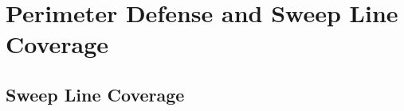 
\chapter{Perimeter Defense and Sweep Line Coverage}
\thispagestyle{myheadings}
\section{Sweep Line Coverage}








% 
% 
% 
% 